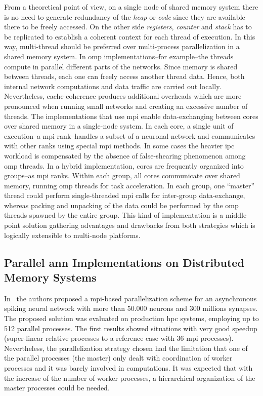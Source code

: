 \documentclass[10pt,journal,compsoc]{IEEEtran}
\begin{document}
From a theoretical point of view, on a single node of shared memory system there is no need to generate redundancy of the \emph{heap} or \emph{code} since they are available there to be freely accessed. On the other side \emph{registers}, \emph{counter} and \emph{stack} has to be replicated to establish a coherent context for each thread of execution. In this way, multi-thread should be preferred over multi-process parallelization in a shared memory system. In \gls{omp} implementations--for example--the threads compute in parallel different parts of the networks. Since memory is shared between threads, each one can freely access another thread data. Hence, both internal network computations and data traffic are carried out locally. Nevertheless, cache-coherence produces additional overheads which are more pronounced when running small networks and creating an excessive number of threads. The implementations that use \gls{mpi} enable data-exchanging between cores over shared memory in a single-node system. In each core, a single unit of execution--a \gls{mpi} rank--handles a subset of a neuronal network and communicates with other ranks using special \gls{mpi} methods. In some cases the heavier \gls{ipc} workload is compensated by the absence of false-shearing phenomenon among \gls{omp} threads. In a hybrid implementation, cores are frequently organized into groups--as \gls{mpi} ranks. Within each group, all cores communicate over shared memory, running \gls{omp} threads for task acceleration. In each group, one “master” thread could perform single-threaded \gls{mpi} calls for inter-group data-exchange, whereas packing and unpacking of the data could be performed by the \gls{omp} threads spawned by the entire group. This kind of implementation is a middle point solution gathering advantages and drawbacks from both strategies which is logically extensible to multi-node platforms.












\subsection{Parallel \gls{ann} Implementations on Distributed Memory Systems}

In~\cite{6821186} the authors proposed a \gls{mpi}-based parallelization scheme for an asynchronous spiking neural network with more than 50.000 neurons and 300 millions synapses. The proposed solution was evaluated on production \gls{hpc} systems, employing up to 512 parallel processes. The first results showed situations with very good speedup (super-linear relative processes to a reference case with 36 \gls{mpi} processes). Nevertheless, the parallelization strategy chosen had the limitation that one of the parallel processes (the master) only dealt with coordination of worker processes and it was barely involved in computations. It was expected that with the increase of the number of worker processes, a hierarchical organization of the master processes could be needed.
\end{document}
